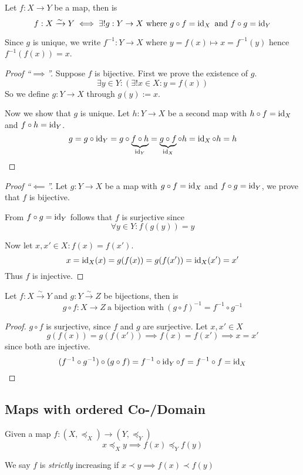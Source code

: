 \begin{proposition}
   Let \(f: X \to Y\) be a map, then is
   \[f: X \xrightarrow{\sim} Y \iff \exists! g: Y \to X~\text{where}~g \circ f = \operatorname{id}_X~\text{and}~f \circ g = \operatorname{id}_Y\]
\end{proposition}
\begin{remark}
   Since \(g\) is unique, we write \(f^{-1}: Y \to X\) where \(y = f(x) \mapsto x = f^{-1}(y)\) hence \(f^{-1}(f(x)) = x\).
\end{remark}
\begin{proof}[Proof ``\(\implies\)'']
   Suppose \(f\) is bijective.
   First we prove the existence of \(g\).
   \[\exists y \in Y: (\exists! x \in X: y = f(x))\]
   So we define \(g: Y \to X\) through \(g(y) := x\).

   Now we show that \(g\) is unique.
   Let \(h: Y \to X\) be a second map with \(h \circ f = \operatorname{id}_X\) and \(f \circ h = \operatorname{id}_Y\).
   \[g = g \circ \operatorname{id}_Y = g \circ \underbrace{f \circ h}_{\operatorname{id}_Y} = \underbrace{g \circ f}_{\operatorname{id}_X} \circ h = \operatorname{id}_X \circ h = h\]
\end{proof}
\begin{proof}[Proof ``\(\impliedby\)'']
   Let \(g: Y \to X\) be a map with \(g \circ f = \operatorname{id}_X\) and \(f \circ g = \operatorname{id}_Y\), we prove that \(f\) is bijective.

   From \(f \circ g = \operatorname{id}_Y\) follows that \(f\) is surjective since
   \[\forall y \in Y: f(g(y)) = y\]

   Now let \(x, x' \in X: f(x) = f(x')\).
   \[x = \operatorname{id}_X(x) = g(f(x)) = g(f(x')) = \operatorname{id}_X(x') = x'\]
   Thus \(f\) is injective.
\end{proof}

\begin{proposition}
   Let \(f: X \xrightarrow{\sim} Y\) and \(g: Y \xrightarrow{\sim} Z\) be bijections, then is
   \[g \circ f: X \to Z~\text{a bijection with}~(g \circ f)^{-1} = f^{-1} \circ g^{-1}\]
\end{proposition}
\begin{proof}
   \(g \circ f\) is surjective, since \(f\) and \(g\) are surjective.
   Let \(x, x' \in X\)
   \[g(f(x)) = g(f(x')) \implies f(x) = f(x') \implies x = x'\]
   since both are injective.
   \[(f^{-1} \circ g^{-1}) \circ (g \circ f) = f^{-1} \circ \operatorname{id}_Y \circ f = f^{-1} \circ f = \operatorname{id}_X\]
\end{proof}

\subsection{Maps with ordered Co-/Domain}
\begin{definition}
   Given a map \(f: (X, \preceq_X) \to (Y, \preceq_Y)\)
   \[x \preceq_X y \implies f(x) \preceq_Y f(y)\]
\end{definition}
\begin{remark}
   We say \(f\) is \textit{strictly} increasing if \(x \prec y \implies f(x) \prec f(y)\)
\end{remark}


